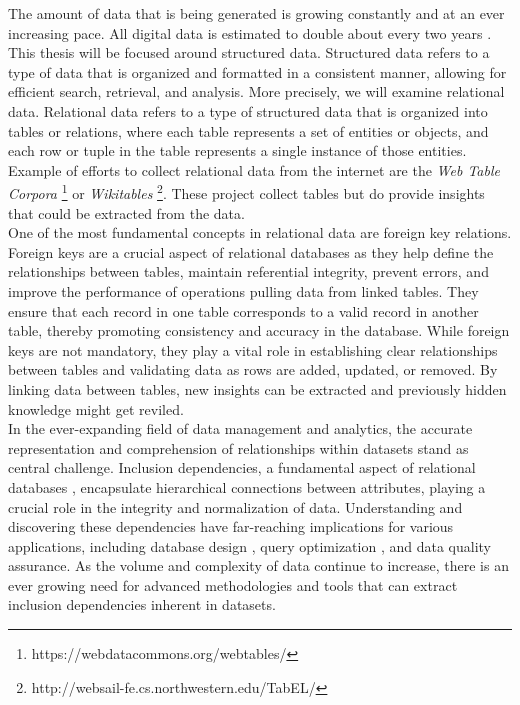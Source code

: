 The amount of data that is being generated is growing constantly and at an ever increasing pace. All digital data is estimated to double about every two years \cite{gantz2012digital}. This thesis will be focused around structured data. Structured data refers to a type of data that is organized and formatted in a consistent manner, allowing for efficient search, retrieval, and analysis. More precisely, we will examine relational data. Relational data refers to a type of structured data that is organized into tables or relations, where each table represents a set of entities or objects, and each row or tuple in the table represents a single instance of those entities. Example of efforts to collect relational data from the internet are the \textit{Web Table Corpora} \footnote{https://webdatacommons.org/webtables/} or \textit{Wikitables} \footnote{http://websail-fe.cs.northwestern.edu/TabEL/}. These project collect tables but do provide insights that could be extracted from the data. \\

\noindent One of the most fundamental concepts in relational data are foreign key relations. Foreign keys are a crucial aspect of relational databases as they help define the relationships between tables, maintain referential integrity, prevent errors, and improve the performance of operations pulling data from linked tables. They ensure that each record in one table corresponds to a valid record in another table, thereby promoting consistency and accuracy in the database. While foreign keys are not mandatory, they play a vital role in establishing clear relationships between tables and validating data as rows are added, updated, or removed. By linking data between tables, new insights can be extracted and previously hidden knowledge might get reviled. \\

\noindent In the ever-expanding field of data management and analytics, the accurate representation and comprehension of relationships within datasets stand as central challenge. Inclusion dependencies, a fundamental aspect of relational databases \cite{casanova1982inclusion}, encapsulate hierarchical connections between attributes, playing a crucial role in the integrity and normalization of data. Understanding and discovering these dependencies have far-reaching implications for various applications, including database design \cite{levene2000justification}, query optimization \cite{gryz1998query}, and data quality assurance. As the volume and complexity of data continue to increase, there is an ever growing need for advanced methodologies and tools that can extract inclusion dependencies inherent in datasets. \\


